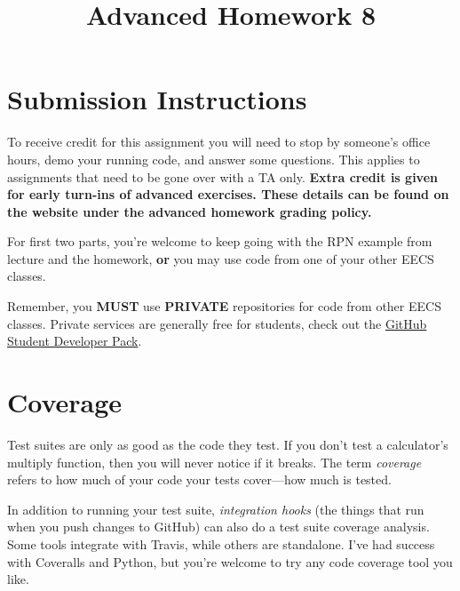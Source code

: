 \documentclass{article}
\begin{document}
\fancyfoot[C]{\color{gray} \thepage~/~\pageref*{LastPage}}
\pagestyle{fancyplain}

\title{\textbf{Advanced Homework 8\\}}
\author{\textbf{\color{red}{Due: Wednesday, February 28th, 11:59PM (Hard Deadline)}}}
\date{}
\maketitle


\section*{Submission Instructions}
To receive credit for this assignment you will need to stop by someone's
office hours, demo your running code, and answer some questions. \textbf{\color{red}{Make sure
to check the office hour schedule as the real due date is at the last office
hours before the date listed above.}} This applies to assignments that need to be gone over with a TA only.
\textbf{Extra credit is given for early turn-ins of advanced exercises. These details can be found on the website under the advanced homework grading policy.}


\begin{mdframed}[innerleftmargin=38pt,innerrightmargin=38pt]\justify
  For first two parts, you're welcome to keep going with the RPN example from
  lecture and the homework, \textbf{or} you may use code from one of your
  other EECS classes.

  {\color{red}Remember, you \textbf{MUST} use \textbf{PRIVATE} repositories
    for code from other EECS classes.} Private services are generally free for
  students, check out the \href{https://education.github.com/pack}{GitHub Student Developer Pack}.
\end{mdframed}

\section{Coverage}

Test suites are only as good as the code they test. If you don't test a
calculator's multiply function, then you will never notice if it breaks. The
term \emph{coverage} refers to how much of your code your tests cover---how
much is tested.

In addition to running your test suite, \emph{integration hooks} (the things
that run when you push changes to GitHub) can also do a test suite coverage
analysis. Some tools integrate with Travis, while others are standalone. I've
had success with Coveralls and Python, but you're welcome to try any code
coverage tool you like.
\end{document}
